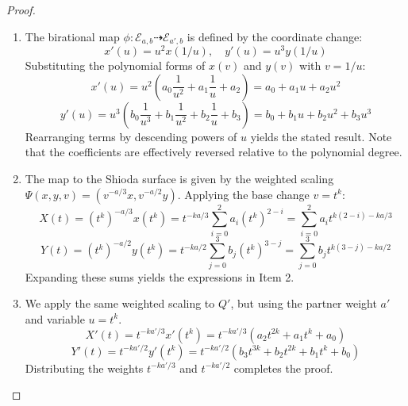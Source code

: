 \documentclass[11pt]{amsart}
\newcommand{\Ee}{{\mathcal E}}
\numberwithin{equation}{section}
\numberwithin{table}{section}
\newcommand\<{\langle}
\begin{document}
\begin{proof}
	\begin{enumerate}
	\item [(i)]
	The birational map $\phi: \Ee_{a,b} \dashrightarrow \Ee_{a', b}$ is defined by the coordinate change:
	\[ x'(u) = u^2 x(1/u), \quad y'(u) = u^3 y(1/u) \]
	Substituting the polynomial forms of $x(v)$ and $y(v)$ with $v=1/u$:
	\[ x'(u) = u^2 \left( a_0 \frac{1}{u^2} + a_1 \frac{1}{u} + a_2 \right) = a_0 + a_1 u + a_2 u^2 \]
	\[ y'(u) = u^3 \left( b_0 \frac{1}{u^3} + b_1 \frac{1}{u^2} + b_2 \frac{1}{u} + b_3 \right) = b_0 + b_1 u + b_2 u^2 + b_3 u^3 \]
	Rearranging terms by descending powers of $u$ yields the stated result. Note that the coefficients are effectively reversed relative to the polynomial degree.
	
	\item [(ii)]
	The map to the Shioda surface is given by the weighted scaling $\Psi(x, y, v) = (v^{-a/3}x, v^{-a/2}y)$. Applying the base change $v=t^k$:
	\[ X(t) = (t^k)^{-a/3} x(t^k) = t^{-ka/3} \sum_{i=0}^{2} a_i (t^k)^{2-i} = \sum_{i=0}^{2} a_i t^{k(2-i) - ka/3} \]
	\[ Y(t) = (t^k)^{-a/2} y(t^k) = t^{-ka/2} \sum_{j=0}^{3} b_j (t^k)^{3-j} = \sum_{j=0}^{3} b_j t^{k(3-j) - ka/2} \]
	Expanding these sums yields the expressions in Item 2.
	
		\item [(iii)]
	We apply the same weighted scaling to $Q'$, but using the partner weight $a'$ and variable $u=t^k$.
	\[ X'(t) = t^{-ka'/3} x'(t^k) = t^{-ka'/3} (a_2 t^{2k} + a_1 t^k + a_0) \]
	\[ Y'(t) = t^{-ka'/2} y'(t^k) = t^{-ka'/2} (b_3 t^{3k} + b_2 t^{2k} + b_1 t^k + b_0) \]
	Distributing the weights $t^{-ka'/3}$ and $t^{-ka'/2}$ completes the proof.
	 \end{enumerate}
\end{proof}

 



\end{document}

